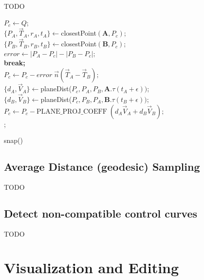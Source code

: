 \documentclass[journal, letterpaper]{IEEEtran}
\begin{document}
TODO
\blindtext


\begin{algorithm}[ht!]
  $P_c \leftarrow Q$; \\
   {
    $\{P_A, \vec{T}_A, r_A, t_A\} \leftarrow $closestPoint$(\mathbf{A}, P_c)$;  \\
    $\{P_B, \vec{T}_B, r_B, t_B\} \leftarrow $closestPoint$(\mathbf{B}, P_c)$;  \\
    $error \leftarrow |P_A - P_c| - |P_B - P_c|;$\\ 
     \textbf{break;} \\
    $P_c \leftarrow P_c - error \;\vec{n}(\vec{T}_A - \vec{T}_B);$ \\
    $\{d_A, \vec{V}_A\} \leftarrow $planeDist($P_c, P_A, P_B, \mathbf{A}.\tau(t_A + \epsilon))$;\\
    $\{d_B, \vec{V}_B\} \leftarrow $planeDist($P_c, P_B, P_A, \mathbf{B}.\tau(t_B + \epsilon))$;\\
    $P_c \leftarrow P_c - \text{PLANE\_PROJ\_COEFF} \;(d_A \vec{V}_A + d_B \vec{V}_B); $\\
  }
  ;
  \caption{snap()}
\end{algorithm}


\subsection{Average Distance (geodesic) Sampling}
TODO

\subsection{Detect non-compatible control curves}
TODO

\newpage
\section{Visualization and Editing}\label{chapter:Visual}
\end{document}
